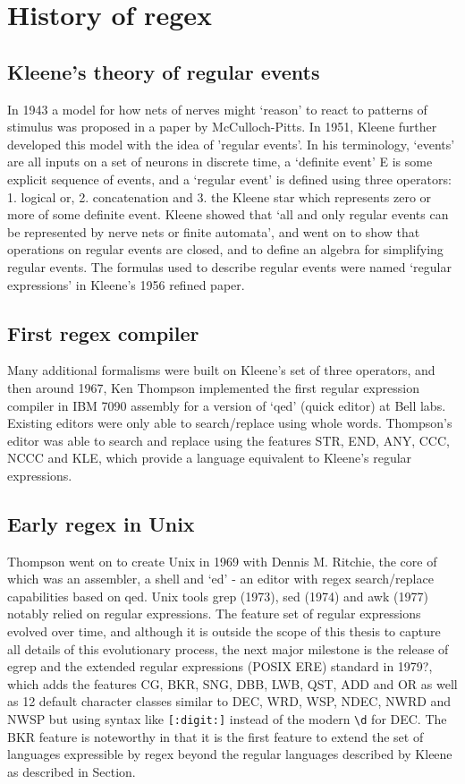 \section{History of regex}

\subsection{Kleene's theory of regular events}
In 1943 a model for how nets of nerves might `reason' to react to patterns of stimulus was proposed in a paper by McCulloch-Pitts.  In 1951, Kleene further developed this model with the idea of 'regular events'.  In his terminology, `events' are all inputs on a set of neurons in discrete time, a `definite event' E is some explicit sequence of events, and a `regular event' is defined using three operators: 1. logical or, 2. concatenation and 3. the Kleene star which represents zero or more of some definite event.  Kleene showed that `all and only regular events can be represented by nerve nets or finite automata', and went on to show that operations on regular events are closed, and to define an algebra for simplifying regular events.  The formulas used to describe regular events were named `regular expressions' in Kleene's 1956 refined paper.

\subsection{First regex compiler}
Many additional formalisms were built on Kleene's set of three operators, and then around 1967, Ken Thompson implemented the first regular expression compiler in IBM 7090 assembly for a version of `qed' (quick editor) at Bell labs.  Existing editors were only able to search/replace using whole words.  Thompson's editor was able to search and replace using the features STR, END, ANY, CCC, NCCC and KLE, which provide a language equivalent to Kleene's regular expressions.

\subsection{Early regex in Unix}
Thompson went on to create Unix in 1969 with Dennis M. Ritchie, the core of which was an assembler, a shell and `ed' - an editor with regex search/replace capabilities based on qed.  Unix tools grep (1973), sed (1974) and awk (1977) notably relied on regular expressions.  The feature set of regular expressions evolved over time, and although it is outside the scope of this thesis to capture all details of this evolutionary process, the next major milestone is the release of egrep and the extended regular expressions (POSIX ERE) standard in 1979?, which adds the features CG, BKR, SNG, DBB, LWB, QST, ADD and OR as well as 12 default character classes similar to DEC, WRD, WSP, NDEC, NWRD and NWSP but using syntax like \verb![:digit:]! instead of the modern \verb!\d! for DEC.  The BKR feature is noteworthy in that it is the first feature to extend the set of languages expressible by regex beyond the regular languages described by Kleene as described in Section.

